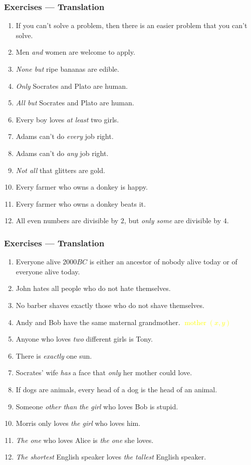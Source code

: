 \documentclass[UTF8,aspectratio=43,11pt,colorlinks,compress,openany]{beamer}%
\begin{document}
\begin{frame}\frametitle{Exercises --- Translation}
		\begin{enumerate}
			\item If you can't solve a problem, then there is an easier problem that you can't solve.
			\item Men \emph{and} women are welcome to apply.
			\item \emph{None but} ripe bananas are edible.
			\item \emph{Only} Socrates and Plato are human.
			\item \emph{All but} Socrates and Plato are human.
			\item Every boy loves \emph{at least} two girls.
			\item Adams can't do \emph{every} job right.
			\item Adams can't do \emph{any} job right.
			\item \emph{Not all} that glitters are gold.
			\item Every farmer who owns a donkey is happy.
			\item Every farmer who owns a donkey beats it.
			\item All even numbers are divisible by $2$, but \emph{only some} are divisible by $4$.
		\end{enumerate}
\end{frame}

\begin{frame}\frametitle{Exercises --- Translation}
		\begin{enumerate}
			\item Everyone alive $2000BC$ is either an ancestor of nobody alive today or of everyone alive today.
			\item John hates all people who do not hate themselves.
			\item No barber shaves exactly those who do not shave themselves.
			\item Andy and Bob have the same maternal grandmother. \quad\textcolor{yellow}{$\operatorname{mother}(x,y)$}
			\item Anyone who loves \emph{two} different girls is Tony.
			\item There is \emph{exactly} one sun.
			\item Socrates' wife \emph{has} a face that \emph{only} her mother could love.
			\item If dogs are animals, every head of a dog is the head of an animal.
			\item Someone \emph{other than} \emph{the girl} who loves Bob is stupid.
			\item Morris only loves \emph{the girl} who loves him.
			\item \emph{The one} who loves Alice is \emph{the one} she loves.
			\item \emph{The shortest} English speaker loves \emph{the tallest} English speaker.
		\end{enumerate}
\end{frame}
\end{document}
